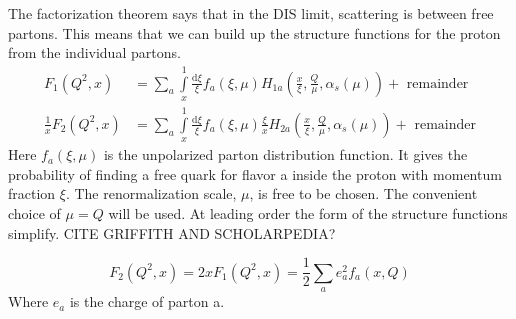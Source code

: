 \documentclass[abstract = on,listof=totoc, bibliography=totoc]{scrreprt}
\begin{document}
The factorization theorem says that in the DIS limit,  scattering is between free partons. This means that we can build up the structure functions for the proton from the individual partons. 
\begin{eqnarray}
F_1(Q^2,x) &= \sum\limits_a \int\limits_x^1 \frac{\text{d}\xi}{\xi}f_a(\xi,\mu)H_{1a}\left(\frac{x}{\xi},\frac{Q}{\mu}, \alpha_s(\mu)\right) + \text{ remainder}\\
\frac{1}{x}F_2(Q^2,x) &= \sum\limits_a \int\limits_x^1 \frac{\text{d}\xi}{\xi}f_a(\xi,\mu)\frac{\xi}{x}H_{2a}\left(\frac{x}{\xi},\frac{Q}{\mu}, \alpha_s(\mu)\right) + \text{ remainder}
\end{eqnarray} 
Here $f_a(\xi,\mu)$ is the unpolarized parton distribution function. It gives the probability of finding a free quark for flavor a inside the proton with momentum fraction $\xi$. The renormalization scale, $\mu$, is free to be chosen. The convenient choice of $\mu = Q$ will be used.\cite{factorization} At leading order the form of the structure functions simplify. CITE GRIFFITH AND SCHOLARPEDIA?

\begin{equation}
F_2(Q^2,x) = 2x F_1(Q^2,x) = \frac{1}{2}\sum\limits_a e_a ^2 f_a(x, Q)
\end{equation} 
Where $e_a$ is the charge of parton a.
\end{document}
